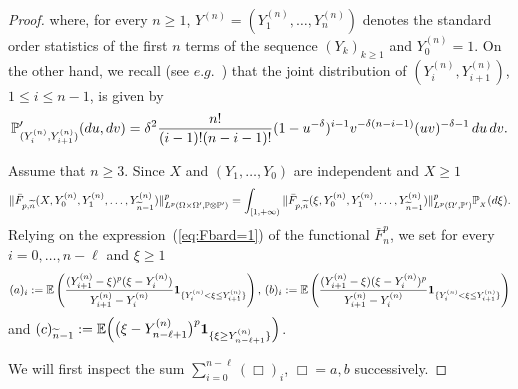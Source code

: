 \begin{proof}
\noindent where, for every $n \ge 1$,  $Y^{(n)}=(Y^{(n)}_1,\ldots,Y^{(n)}_n)$ denotes the standard order statistics of the first $n$  terms of the sequence $(Y_k)_{k\ge1}$ and $Y^{(n)}_0=1$.  On the other hand, we recall (see $e.g.$~\cite{CAVC}) that  the joint distribution of $(Y^{(n)}_i,Y^{(n)}_{i+1})$, $1\le i\le n-1$,  is given by 
\[
\mathbb{P}'_{(Y^{(n)}_i,Y^{(n)}_{i+1})}(du,dv)=\delta^2  \frac{n!}{(i-1)!(n-i-1)!}(1-u^{-\delta})^{i-1}v^{-\delta(n-i-1)}(uv)^{-\delta-1}\,du\,dv.
\]


\medskip
{} Assume that $n\ge 3$.  Since $X$ and $(Y_1,\ldots,Y_0)$ are  independent and $X\ge 1$
\[
\|\bar F_{p,\widetilde n}(X,Y^{(n)}_0,Y^{(n)}_1,\ldots,Y^{(n)}_{\widetilde n-1})\|^p_{L^p(\Omega\times \Omega', \mathbb{P}\otimes \mathbb{P}')}= \int_{[1,+\infty)}\|\bar F_{p,\widetilde n}(\xi, Y^{(n)}_0,Y^{(n)}_1,\ldots,Y^{(n)}_{\widetilde n-1})\|^p_{L^p( \Omega', \mathbb{P}')}\mathbb{P}_{_X}(d\xi).
\]
Relying on the expression~(\ref{eq:Fbard=1}) of the functional $\bar F^p_n$, we set for every $i=0,\ldots,n-\ell$ and $\xi\ge 1$
 \[
 (a)_i := \mathbb{E} \left(\frac{(Y^{(n)}_{i+1}-\xi)^p(\xi-Y^{(n)}_i)}{Y^{(n)}_{i+1}-Y^{(n)}_i}\mbox{\bf 1}_{\{Y^{(n)}_i< \xi\le Y^{(n)}_{i+1}\}}\right),\,
 (b)_i := \mathbb{E} \left(\frac{(Y^{(n)}_{i+1}-\xi)(\xi-Y^{(n)}_i)^p}{Y^{(n)}_{i+1}-Y^{(n)}_i}\mbox{\bf 1}_{\{Y^{(n)}_i< \xi\le Y^{(n)}_{i+1}\}}\right)
 \]
 and $\displaystyle (c)_{\widetilde n-1}:= \mathbb{E}\Big(\big ( \xi-Y^{(n)}_{n-\ell+1}\big)^p\mbox{\bf 1}_{\{\xi\ge Y^{(n)}_{n-\ell+1}\}} \Big)$.
 
 We will first inspect the sum $\sum_{i=0}^{n-\ell} (\Box)_i$, $\Box=a,b$   successively.
 

\end{proof}
